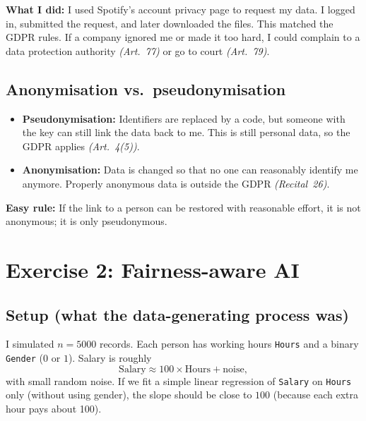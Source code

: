 \documentclass[12pt]{article}
\begin{document}
\noindent\textbf{What I did:} I used Spotify's account privacy page to request my data. I logged in, submitted the request, and later downloaded the files. This matched the GDPR rules. If a company ignored me or made it too hard, I could complain to a data protection authority \emph{(Art.~77)} or go to court \emph{(Art.~79)}.

\subsection{Anonymisation vs.\ pseudonymisation}
\begin{itemize}
  \item \textbf{Pseudonymisation:} Identifiers are replaced by a code, but someone with the key can still link the data back to me. This is still personal data, so the GDPR applies \emph{(Art.~4(5))}.
  \item \textbf{Anonymisation:} Data is changed so that no one can reasonably identify me anymore. Properly anonymous data is outside the GDPR \emph{(Recital~26)}.
\end{itemize}
\noindent\textbf{Easy rule:} If the link to a person can be restored with reasonable effort, it is not anonymous; it is only pseudonymous.

\section{Exercise 2: Fairness-aware AI}

\subsection{Setup (what the data-generating process was)}
I simulated $n=5000$ records. Each person has working hours \texttt{Hours} and a binary \texttt{Gender} ($0$ or $1$). Salary is roughly
\begin{equation*}
\text{Salary} \approx 100 \times \text{Hours} + \text{noise},
\end{equation*}
with small random noise. If we fit a simple linear regression of \texttt{Salary} on \texttt{Hours} only (without using gender), the slope should be close to $100$ (because each extra hour pays about 100).
\end{document}
